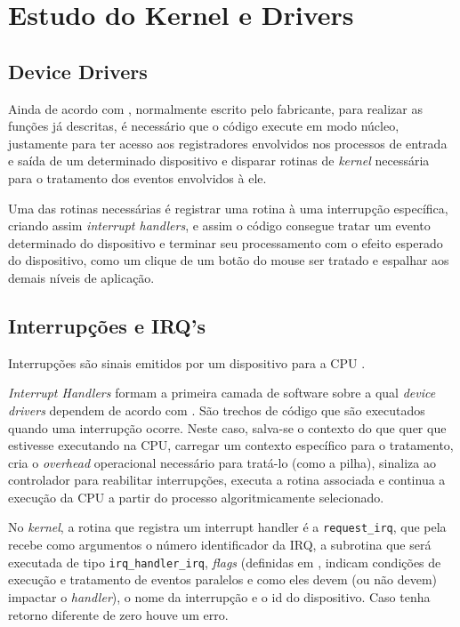 \documentclass[
	12pt,			
	openright,			%
	twoside,			%
	a4paper,			%
	english,			%
	brazil,				%
	]{abntex2}
\begin{document}
\chapter{Estudo do Kernel e Drivers}

\section{Device Drivers}

Ainda de acordo com \textcite{TanenbaumBos14}, normalmente escrito pelo
fabricante, para realizar as funções já descritas, é necessário que o código
execute em modo núcleo, justamente para ter acesso aos registradores envolvidos
nos processos de entrada e saída de um determinado dispositivo e disparar
rotinas de \emph{kernel} necessária para o tratamento dos eventos envolvidos à
ele.

Uma das rotinas necessárias é registrar uma rotina à uma interrupção específica,
criando assim \emph{interrupt handlers}, e assim o código consegue tratar um
evento determinado do dispositivo e terminar seu processamento com o efeito
esperado do dispositivo, como um clique de um botão do mouse ser tratado e
espalhar aos demais níveis de aplicação.

\section{Interrupções e IRQ's}

Interrupções são sinais emitidos por um dispositivo para a CPU
\cite{interruptsOSDevWiki}.

\emph{Interrupt Handlers} formam a primeira camada de software sobre a qual
\emph{device drivers} dependem de acordo com \cite{TanenbaumBos14}. São trechos
de código que são executados quando uma interrupção ocorre. Neste caso, salva-se
o contexto do que quer que estivesse executando na CPU, carregar um contexto
específico para o tratamento, cria o \emph{overhead} operacional necessário para
tratá-lo (como a pilha), sinaliza ao controlador para reabilitar interrupções,
executa a rotina associada e continua a execução da CPU a partir do processo
algoritmicamente selecionado.

No \emph{kernel}, a rotina que registra um interrupt handler é a
\lstinline{request_irq}, que pela \cite{LinuxDocsLinuxGenericIRQHandling}
recebe como argumentos o número identificador da IRQ, a subrotina que será
executada de tipo \lstinline{irq_handler_irq}, \emph{flags} (definidas em
\cite{interruptHSourceCode}, indicam condições de execução e tratamento de
eventos paralelos e como eles devem (ou não devem) impactar o \emph{handler}), o
nome da interrupção e o id do dispositivo. Caso tenha retorno diferente de zero
houve um erro.
\end{document}
